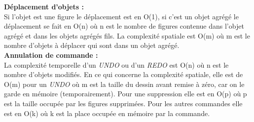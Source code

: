 \documentclass[legalpaper]{article}
\begin{document}
\textbf{Déplacement d'objets :}\\
\hspace*{\parindent}Si l'objet est une figure le déplacement est en O(1), si c'est un objet agrégé le déplacement se fait en O(n) où n est le nombre de figures contenue dans l'objet agrégé et dans les objets agrégés fils. La complexité spatiale est O(m) où m est le nombre d'objets à déplacer qui sont dans un objet agrégé.\\

\textbf{Annulation de commande :}\\
\hspace*{\parindent}La complexité temporelle d'un \textit{UNDO} ou d'un \textit{REDO} est O(n) où n est le nombre d'objets modifiés. En ce qui concerne la complexité spatiale, elle est de O(m) pour un \textit{UNDO} où m est la taille du dessin avant remise à zéro, car on le garde en mémoire (temporairement). Pour une suppression elle est en O(p) où p est la taille occupée par les figures supprimées. Pour les autres commandes elle est en O(k) où k est la place occupée en mémoire par la commande.\\
\end{document}
